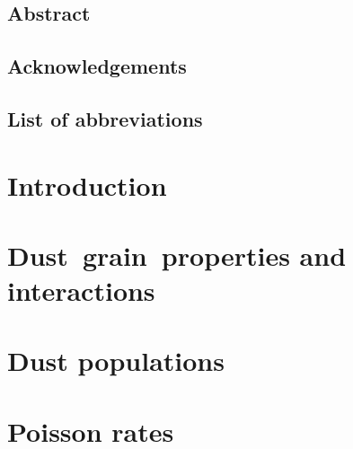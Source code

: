\documentclass[11pt,twoside,openright]{book}
\begin{document}
\frontmatter


\newpage\null\thispagestyle{empty}\newpage

\setcounter{page}{1}\thispagestyle{empty}\newpage

\section*{Abstract}

\newpage\null\newpage

\section*{Acknowledgements}

\newpage\null\newpage

\tableofcontents

\newpage\null\newpage
\section*{List of abbreviations}

\newpage\null\newpage



\mainmatter

\chapter{Introduction}


\chapter{Dust~grain~properties and interactions}\label{ch:forces}


\chapter{Dust populations}\label{ch:populations}


\chapter{Poisson rates}\label{ch:statistics}

\end{document}
